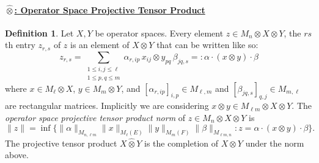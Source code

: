 \documentclass[12pt]{article}
\theoremstyle{definition}
\newtheorem{definition}[theorem]{Definition}
\newcommand{\<}{\langle}
\renewcommand{\>}{\rangle}
\renewcommand{\hat}[1]{\widehat{#1}}
\begin{document}
\paragraph{\underline{$\widehat \otimes$: Operator Space Projective Tensor Product}}

\begin{definition} \cite[Chapter 4]{intro-op-sp-pisier} \label{defn: osptp}
    Let $X,Y$ be operator spaces. Every element $z \in M_n \otimes X \otimes Y$, the $rs$th entry $z_{r,s}$ of $z$ is an element of $X \otimes Y$ that can be written like so:
    \[
    z_{r,s} = \sum_{\substack{1 \leq i,j \leq \ell \\ 1 \leq p,q \leq m}} \alpha_{r,ip}\,  x_{ij} \otimes y_{pq} \, \beta_{jq,s} =: \alpha \cdot (x \otimes y) \cdot \beta
    \]
    where $x \in M_\ell \otimes X$, $y \in M_m \otimes Y$, and $[\alpha_{r,ip}]_{i,p} \in M_{\ell, m}$ and $[\beta_{jq,s}]_{q,j} \in M_{m, \ell}$ are rectangular matrices. Implicitly we are considering $x \otimes y \in M_{\ell m} \otimes X \otimes Y$. The \textit{operator space projective tensor product norm} of $z \in M_n \otimes X  \otimes Y$ is
    \[
    \|z\| = \inf \{\|\alpha\|_{M_{n,\ell m}} \|x\|_{M_\ell(E)} \|y\|_{M_m(F)} \|\beta\|_{M_{\ell m,n}}: z = \alpha \cdot (x \otimes y)\cdot \beta\}.
    \]
    The projective tensor product $X \hat \otimes Y$ is the completion of $X \otimes Y$ under the norm above.
\end{definition}
\end{document}
